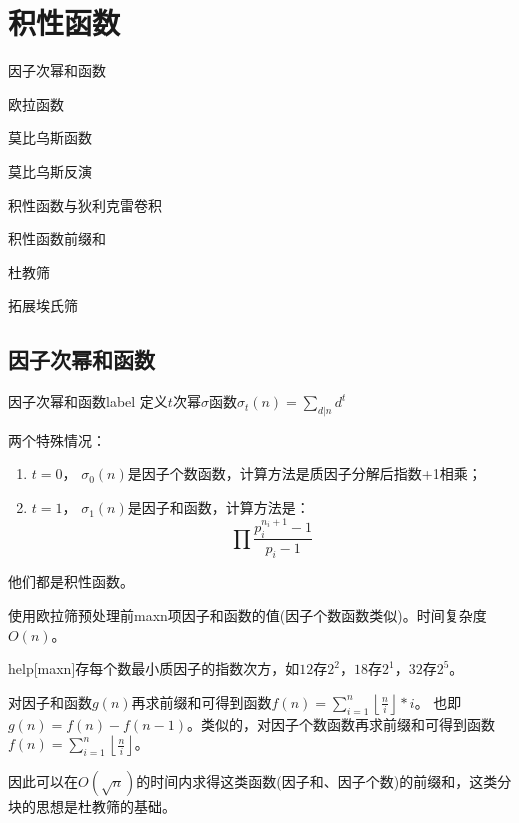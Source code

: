 \chapter{积性函数}

\begin{introduction}
	\item 因子次幂和函数
	\item 欧拉函数
	\item 莫比乌斯函数
	\item 莫比乌斯反演
	\item 积性函数与狄利克雷卷积
	\item 积性函数前缀和
	\item 杜教筛
	\item 拓展埃氏筛
\end{introduction}


\section{因子次幂和函数}
\begin{definition}{因子次幂和函数}{label}
定义$t$次幂$\sigma$函数$\sigma_t(n)=\sum_{d|n}d^t$

两个特殊情况：

\begin{enumerate}
\item $t=0$， $\sigma_0(n)$是因子个数函数，计算方法是质因子分解后指数+1相乘；
\item $t=1$， $\sigma_1(n)$是因子和函数，计算方法是：
$$
\prod \frac{p_{i}^{n_{i}+1}-1}{p_{i}-1}
$$
\end{enumerate}

他们都是积性函数。
\end{definition}

使用欧拉筛预处理前maxn项因子和函数的值(因子个数函数类似)。时间复杂度$O(n)$。

help[maxn]存每个数最小质因子的指数次方，如$12$存$2^2$，$18$存$2^1$，$32$存$2^5$。



\begin{note}
对因子和函数$g(n)$再求前缀和可得到函数$f(n)=\sum_{i=1}^{n}\left \lfloor \frac{n}{i} \right \rfloor*i$。
也即$g(n)=f(n)-f(n-1)$。类似的，对因子个数函数再求前缀和可得到函数$f(n)=\sum_{i=1}^{n}\left \lfloor \frac{n}{i} \right \rfloor$。

{\heiti 因此可以在$O(\sqrt{n})$的时间内求得这类函数(因子和、因子个数)的前缀和，这类分块的思想是杜教筛的基础。}
\end{note}

